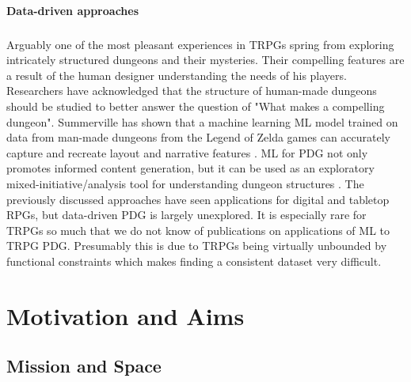 \documentclass{UoYCSproject}
\begin{document}
\subsubsection{Data-driven approaches}
\label{subsub:DataDriven}
\paragraph{}
Arguably one of the most pleasant experiences in TRPGs spring from exploring intricately structured dungeons and their mysteries. Their compelling features are a result of the human designer understanding the needs of his players. Researchers have acknowledged that the structure of human-made dungeons should be studied to better answer the question of "What makes a compelling dungeon". Summerville has shown that a machine learning ML model trained on data from man-made dungeons from the Legend of Zelda games can accurately capture and recreate layout and narrative features \parencite{SummervilleLearningOfZelda}. ML for PDG not only promotes informed content generation, but it can be used as an exploratory mixed-initiative/analysis tool for understanding dungeon structures \parencite{SummervillePCGML}. The previously discussed approaches have seen applications for digital and tabletop RPGs, but data-driven PDG is largely unexplored. It is especially rare for TRPGs so much that we do not know of publications on applications of ML to TRPG PDG. Presumably this is due to TRPGs being virtually unbounded by functional constraints which makes finding a consistent dataset very difficult. 

\chapter{Motivation and Aims}

\section{Mission and Space}
\end{document}
